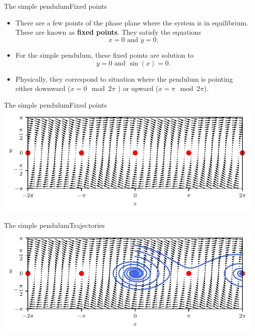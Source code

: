 \documentclass[usenames,dvipsnames,svgnames,10pt,aspectratio=169]{beamer}
\begin{document}
\begin{frame}[t, c]{The simple pendulum}{Fixed points}
	\begin{minipage}{.68\textwidth}
		\begin{itemize}
			\item There are a few points of the phase plane where the system is in equilibrium.
			These are known as \alert{\textbf{fixed points}}.
			They satisfy the equations
			\[
				\dot{x} = 0 \text{ and } \dot{y} = 0.
			\]

			\item For the simple pendulum, these fixed points are solution to
			\[
				y = 0 \text{ and } \sin(x) = 0.
			\]

			\item Physically, they correspond to situation where the pendulum is pointing either downward (\( x = 0 \mod 2\pi\) ) or upward (\( x = \pi \mod 2\pi \)).
		\end{itemize}
	\end{minipage}%
	\hfill
	\begin{minipage}{.28\textwidth}

	\end{minipage}

	\vspace{1cm}
\end{frame}

\begin{frame}[t, c]{The simple pendulum}{Fixed points}
	\centering
	\includegraphics[width=.8\textwidth]{pendulum_fixed_points}
\end{frame}

\begin{frame}[t, c]{The simple pendulum}{Trajectories}
	\centering
	\includegraphics[width=.8\textwidth]{pendulum_fixed_trajectories_bis}
\end{frame}
\end{document}
